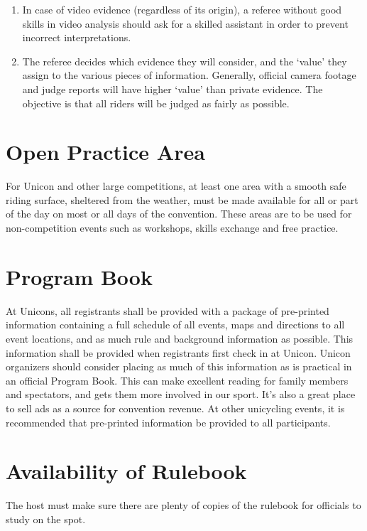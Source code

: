 \begin{enumerate}[leftmargin=1.5em,labelsep=*]
	If someone submits a protest and has evidence that they want to be considered, they must state that with their protest.
	If possible, it is recommended that digital material is copied onto an `official' computer for analysis.
	As an alternative, the evidence must be readily accessible, e.g.\ through a contact person and phone number.
	\item In case of video evidence (regardless of its origin), a referee without good skills in video analysis should ask for a skilled assistant in order to prevent incorrect interpretations.
	\item The referee decides which evidence they will consider, and the `value' they assign to the various pieces of information.
	Generally, official camera footage and judge reports will have higher `value' than private evidence.
	The objective is that all riders will be judged as fairly as possible.
\end{enumerate}

\section{Open Practice Area}
For Unicon and other large competitions, at least one area with a smooth safe riding surface, sheltered from the weather, must be made available for all or part of the day on most or all days of the convention.
These areas are to be used for non-competition events such as workshops, skills exchange and free practice.

\section{Program Book}

At Unicons, all registrants shall be provided with a package of pre-printed information containing a full schedule of all events, maps and directions to all event locations, and as much rule and background information as possible.
This information shall be provided when registrants first check in at Unicon.
Unicon organizers should consider placing as much of this information as is practical in an official Program Book.
This can make excellent reading for family members and spectators, and gets them more involved in our sport.
It's also a great place to sell ads as a source for convention revenue.
At other unicycling events, it is recommended that pre-printed information be provided to all participants.

\section{Availability of Rulebook}
The host must make sure there are plenty of copies of the rulebook for officials to study on the spot.

